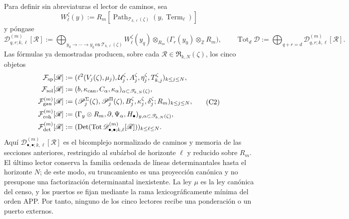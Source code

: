 Para definir sin abreviaturas el lector de caminos, sea
\[
 W_\ell^\zeta(y):=
 R_m[\operatorname{Path}_{\mathscr T_{k,\ell}(\zeta)}
          (y,\operatorname{Term}_\ell)]
\]
y póngase
\[
 \mathscr D_{q,r;k,\ell}^{(m)}[\mathscr R]
 :=\bigoplus_{y_0\to\cdots\to y_q\ \text{en}\
                  \mathscr T_{k,\ell}(\zeta)}
 W_\ell^\zeta(y_q)\otimes_{R_m}
 \bigl(\Gamma_r(y_0)\otimes_{\mathbb Z}R_m\bigr),
 \qquad
 \operatorname{Tot}_d\mathscr D
 :=\bigoplus_{q+r=d}\mathscr D_{q,r;k,\ell}^{(m)}[\mathscr R].
\]
Las fórmulas ya demostradas producen, sobre cada
\(\mathscr R\in\mathfrak R_{k,N}(\zeta)\), los cinco objetos
\[
\begin{aligned}
 \mathcal F_{\rm sp}[\mathscr R]
 &:=(\ell^2(V_j(\zeta),\mu_j),
       \mathcal U_j^\zeta,A_j^\zeta,\eta_j^\zeta,
       T_{k,j}^\zeta)_{k\leq j\leq N},\\
 \mathcal F_{\rm sol}[\mathscr R]
 &:=(b,\kappa_{\rm can},C_\alpha,\kappa_\alpha)
      _{\alpha\subset\mathscr T_{k,N}(\zeta)},\\
 \mathcal F_{\rm gau}^{(m)}[\mathscr R]
 &:=(\mathscr P_j^\Sigma(\zeta),\mathscr P_j^\Pi(\zeta),
       B_j^\zeta,\kappa_j^\zeta,\delta_j^\zeta;R_m)_{k\leq j\leq N},\\
 \mathcal F_{\rm coh}^{(m)}[\mathscr R]
 &:=(\Gamma_y\otimes R_m,\partial,\Psi_\alpha,H_\bullet)
      _{y,\alpha\subset\mathscr T_{k,N}(\zeta)},\\
 \mathcal F_{\rm det}^{(m)}[\mathscr R]
 &:=(\operatorname{Det}(\operatorname{Tot}
       \mathscr D_{\bullet,\bullet;k,\ell}^{(m)}[\mathscr R]))
       _{k\leq\ell\leq N}.
\end{aligned}
\tag{C2}
\label{eq:cinco-lectores-comunes}
\]
Aquí \(\mathscr D_{\bullet,\bullet;k,\ell}^{(m)}[\mathscr R]\) es el
bicomplejo normalizado
de caminos y memoria de las secciones anteriores, restringido al subárbol de
horizonte \(\ell\) y reducido sobre \(R_m\). El último lector conserva la
familia ordenada de líneas determinantales hasta el horizonte \(N\); de este
modo, su truncamiento es una proyección canónica y no presupone una
factorización determinantal inexistente. La ley \(\mu\) es la ley canónica
del censo, y los puertos se fijan mediante la rama lexicográficamente mínima
del orden APP. Por tanto, ninguno de los cinco lectores recibe una ponderación
o un puerto externos.

